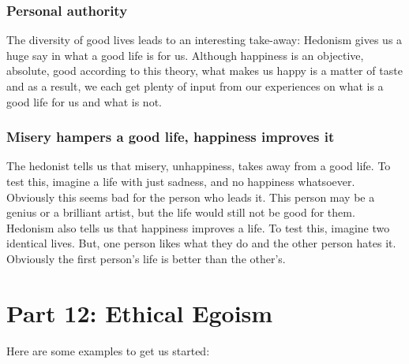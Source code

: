 \subsection{Personal authority}

The diversity of good lives leads to an interesting take-away: Hedonism gives us a huge say in what a good life is for us. Although happiness is an objective, absolute, good according to this theory, what makes us happy is a matter of taste and as a result, we each get plenty of input from our experiences on what is a good life for us and what is not.
\subsection{Misery hampers a good life, happiness improves it}

The hedonist tells us that misery, unhappiness, takes away from a good life. To test this, imagine a life with just sadness, and no happiness whatsoever. Obviously this seems bad for the person who leads it. This person may be a genius or a brilliant artist, but the life would still not be good for them. Hedonism also tells us that happiness improves a life. To test this, imagine two identical lives. But, one person likes what they do and the other person hates it. Obviously the first person’s life is better than the other’s.

\chapter{Part 12: Ethical Egoism}

Here are some examples to get us started:






